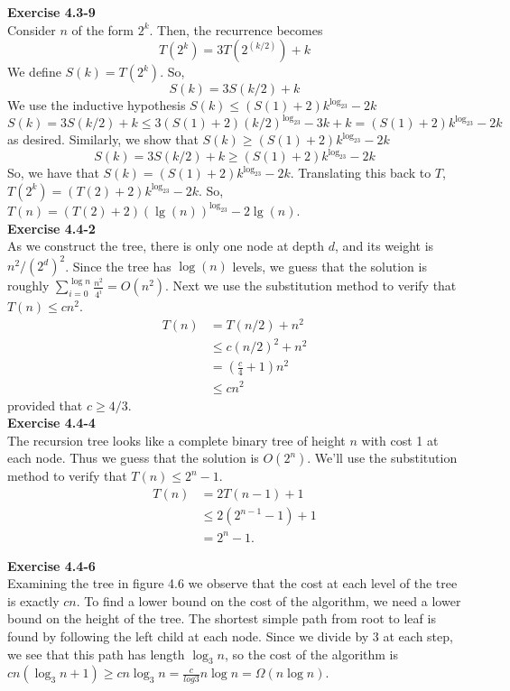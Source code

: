 \documentclass{article}
\begin{document}
\noindent\textbf{Exercise 4.3-9}\\

Consider $n$ of the form $2^k$. Then, the recurrence becomes
\[
T(2^k) = 3 T(2^(k/2)) +k
\]
We define $S(k) = T(2^k)$. So,
\[
S(k) =3S(k/2)+k
\]
We use the inductive hypothesis $S(k)\le (S(1)+2) k^{\log_23} - 2k$
\[
S(k) = 3S(k/2)+k \le 3(S(1)+2)(k/2)^{\log_23} -3k+k = (S(1)+2)k^{\log_23} - 2k
\]
as desired. Similarly, we show that $S(k) \ge (S(1)+2) k^{\log_23} -2k$
\[
S(k) = 3S(k/2) +k \ge (S(1)+2)k^{\log_23} -2k
\]
So, we have that $S(k) = (S(1)+2)k^{\log_23}-2k$. Translating this back to $T$, $T(2^k) = (T(2)+2) k^{\log_23} -2k$. So, $T(n) = (T(2)+2)(\lg(n))^{\log_23} - 2\lg(n)$.\\

\noindent\textbf{Exercise 4.4-2}\\

As we construct the tree, there is only one node at depth $d$, and its weight is $n^2/(2^d)^2$.  Since the tree has $\log(n)$ levels, we guess that the solution is roughly $\sum_{i=0}^{\log n} \frac{n^2}{4^i} = O(n^2)$.  Next we use the substitution method to verify that $T(n) \leq cn^2$.  
\begin{align*}
T(n) &= T(n/2) + n^2 \\
& \leq c(n/2)^2 + n^2 \\
& = (\frac{c}{4} + 1)n^2 \\
&\leq cn^2
\end{align*}
provided that $c \geq 4/3$.  \\

\noindent\textbf{Exercise 4.4-4}\\

The recursion tree looks like a complete binary tree of height $n$ with cost 1 at each node.  Thus we guess that the solution is $O(2^n)$.  We'll use the substitution method to verify that $T(n) \leq 2^n - 1$. 
\begin{align*}
T(n) &= 2T(n-1) + 1 \\
&\leq 2(2^{n-1} - 1) + 1 \\
&= 2^n - 1.
\end{align*}

\noindent\textbf{Exercise 4.4-6}\\

Examining the tree in figure 4.6 we observe that the cost at each level of the tree is exactly $cn$.  To find a lower bound on the cost of the algorithm, we need a lower bound on the height of the tree.  The shortest simple path from root to leaf is found by following the left child at each node.  Since we divide by 3 at each step, we see that this path has length $\log_3 n$, so the cost of the algorithm is $cn(\log_3 n + 1) \geq cn\log_3 n = \frac{c}{log 3} n \log n = \Omega(n \log n)$. \\
\end{document}
